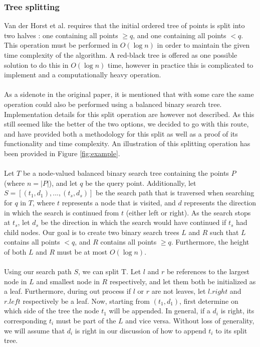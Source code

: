 \documentclass{article}
\begin{document}
\subsubsection{Tree splitting}
Van der Horst et al. requires that the initial ordered tree of points is split into two halves \cite{vanderhorst_et_al:LIPIcs.ESA.2022.67}: one containing all points $\geq q$, and one containing all points $< q$. This operation must be performed in $O(\log n)$ in order to maintain the given time complexity of the algorithm. A red-black tree is offered as one possible solution to do this in $O(\log n)$ time, however in practice this is complicated to implement and a computationally heavy operation.\\\\
As a sidenote in the original paper, it is mentioned that with some care the same operation could also be performed using a balanced binary search tree. Implementation details for this split operation are however not described. As this still seemed like the better of the two options, we decided to go with this route, and have provided both a methodology for this split as well as a proof of its functionality and time complexity. An illustration of this splitting operation has been provided in Figure \ref{fig:example}. \\\\
Let $T$ be a node-valued balanced binary search tree containing the points $P$ (where $n = |P|$), and let $q$ be the query point. Additionally, let $S = [(t_1, d_1), ..., (t_s, d_s)]$  be the search path that is traversed when searching for $q$ in $T$, where $t$ represents a node that is visited, and $d$ represents the direction in which the search is continued from $t$ (either left or right). As the search stops at $t_s$, let $d_s$ be the direction in which the search would have continued if $t_s$ had child nodes. Our goal is to create two binary search trees $L$ and $R$ such that $L$ contains all points $<q$, and $R$ contains all points $\geq q$. Furthermore, the height of both $L$ and $R$ must be at most $O(\log n)$. \\\\
Using our search path $S$, we can split T. Let $l$ and $r$ be references to the largest node in $L$ and smallest node in $R$ respectively, and let them both be initialized as a leaf. Furthermore, during out process if $l$ or $r$ are not leaves, let $l.right$ and $r.left$ respectively be a leaf. Now, starting from $(t_1, d_1)$, first determine on which side of the tree the node $t_1$ will be appended. In general, if a $d_i$ is right, its corresponding $t_i$ must be part of the $L$ and vice versa. Without loss of generality, we will assume that $d_i$ is right in our discussion of how to append $t_i$ to its split tree. \\\\
\end{document}
